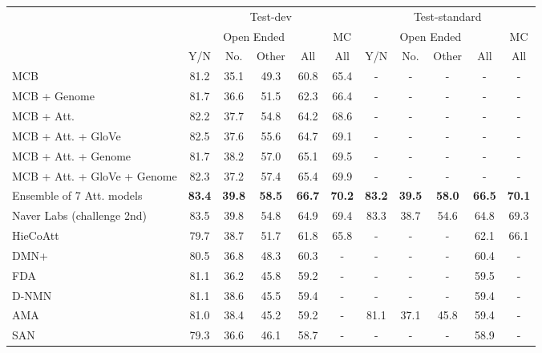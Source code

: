 \documentclass[11pt,letterpaper]{article}
\begin{document}
\begin{table*}[t]
\center
\begin{tabular}{lcccccccccc}
\toprule
  & \multicolumn{5}{c}{Test-dev} & \multicolumn{5}{c}{Test-standard} \\
\cmidrule(l){2-6}\cmidrule(l){7-11}
  & \multicolumn{4}{c}{Open Ended} & \multicolumn{1}{c}{MC} & \multicolumn{4}{c}{Open Ended} & \multicolumn{1}{c}{MC} \\
  \cmidrule(l){2-5}\cmidrule(l){6-6}\cmidrule(l){7-10}\cmidrule(l){11-11}
  & Y/N & No. & Other  & All & All & Y/N & No. & Other  & All & All \\
  \cmidrule(r){1-1}  \cmidrule(l){2-5}\cmidrule(l){6-6}\cmidrule(l){7-10}\cmidrule(l){11-11}
  MCB & 81.2 & 35.1 & 49.3 & 60.8 & 65.4 & - & - & - & - & - \\  MCB + Genome   & 81.7 & 36.6 & 51.5 & 62.3 & 66.4 & - & - & - & - & - \\  MCB + Att. & 82.2 & 37.7 & 54.8 & 64.2 & 68.6 & - & - & -  & - & - \\
  MCB + Att. + GloVe & 82.5 & 37.6 & 55.6 & 64.7 & 69.1 & - & - & - & - & - \\ MCB + Att. + Genome & 81.7 & 38.2 & 57.0 & 65.1 & 69.5 & - & - & - & - & - \\ MCB + Att. + GloVe + Genome & 82.3 & 37.2 & 57.4 & 65.4 & 69.9 & - & - & - & - & - \\ Ensemble of 7 Att. models & \bf 83.4 & \bf 39.8 & \bf 58.5 & \bf 66.7 & \bf 70.2 & \bf 83.2 & \bf 39.5 & \bf 58.0 & \bf 66.5 & \bf 70.1 \\ \cmidrule(r){1-1}  \cmidrule(l){2-5}\cmidrule(l){6-6}\cmidrule(l){7-10}\cmidrule(l){11-11}
    Naver Labs (challenge 2nd) & 83.5 & 39.8 & 54.8 & 64.9 & 69.4 & 83.3 & 38.7 & 54.6 & 64.8 & 69.3 \\
   HieCoAtt \cite{lu2016hiecoatt} & 79.7 & 38.7 & 51.7 & 61.8 & 65.8 & - & - & - & 62.1 & 66.1 \\
  DMN+ \cite{xiong16dynamic} & 80.5 & 36.8 & 48.3 & 60.3 & -& -&- &- & 60.4 & - \\
  FDA \cite{ilievski2016fda} & 81.1 & 36.2 & 45.8 & 59.2 & -& - & - & - & 59.5 & - \\
  D-NMN \cite{andreas16naacl} & 81.1 & 38.6 & 45.5 & 59.4 & - & - & - & - & 59.4 & -\\
  AMA \cite{wu16cvpr} & 81.0 & 38.4 & 45.2 & 59.2 & -& 81.1 & 37.1 & 45.8 & 59.4 & - \\
  SAN \cite{yang2015stacked} & 79.3 & 36.6 & 46.1 & 58.7 & -& - & - & - & 58.9 & - \\

\end{tabular}
\end{table*}
\end{document}
